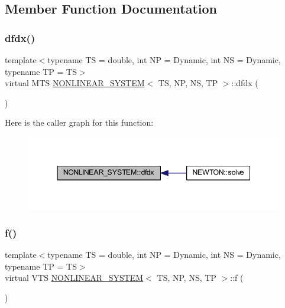\subsection{Member Function Documentation}
\mbox{\label{class_n_o_n_l_i_n_e_a_r___s_y_s_t_e_m_a531f56bcbc77f2219164af40aa16fad2}} 
\subsubsection{\texorpdfstring{dfdx()}{dfdx()}}
{\footnotesize\ttfamily template$<$typename TS = double, int NP = Dynamic, int NS = Dynamic, typename TP = TS$>$ \\
virtual M\+TS \mbox{\hyperlink{class_n_o_n_l_i_n_e_a_r___s_y_s_t_e_m}{N\+O\+N\+L\+I\+N\+E\+A\+R\+\_\+\+S\+Y\+S\+T\+EM}}$<$ TS, NP, NS, TP $>$\+::dfdx (\begin{DoxyParamCaption}{ }\end{DoxyParamCaption})\hspace{0.3cm}{\ttfamily [pure virtual]}}

Here is the caller graph for this function\+:\nopagebreak
\begin{figure}[H]
\begin{center}
\leavevmode
\includegraphics[width=345pt]{class_n_o_n_l_i_n_e_a_r___s_y_s_t_e_m_a531f56bcbc77f2219164af40aa16fad2_icgraph}
\end{center}
\end{figure}
\mbox{\label{class_n_o_n_l_i_n_e_a_r___s_y_s_t_e_m_a65827d7df297f26cd3f14f472a212077}} 
\subsubsection{\texorpdfstring{f()}{f()}}
{\footnotesize\ttfamily template$<$typename TS = double, int NP = Dynamic, int NS = Dynamic, typename TP = TS$>$ \\
virtual V\+TS \mbox{\hyperlink{class_n_o_n_l_i_n_e_a_r___s_y_s_t_e_m}{N\+O\+N\+L\+I\+N\+E\+A\+R\+\_\+\+S\+Y\+S\+T\+EM}}$<$ TS, NP, NS, TP $>$\+::f (\begin{DoxyParamCaption}{ }\end{DoxyParamCaption})\hspace{0.3cm}{\ttfamily [pure virtual]}}

